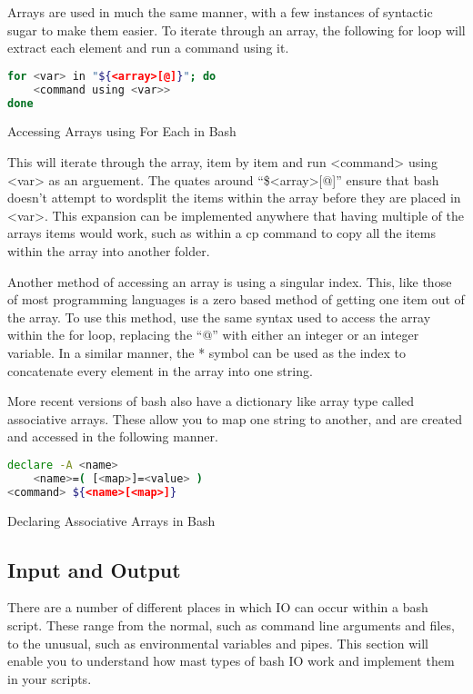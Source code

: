 			Arrays are used in much the same manner, with a few instances of syntactic sugar to make them easier.
			To iterate through an array, the following for loop will extract each element and run a command using it.
			\begin{code}
			\begin{lstlisting}[language=bash]
for <var> in "${<array>[@]}"; do
	<command using <var>>
done
			\end{lstlisting}
			\label{code:ForEachArrayAccess}
			\caption{Accessing Arrays using For Each in Bash}
			\end{code}
			This will iterate through the array, item by item and run <command> using <var> as an arguement.
			The quates around ``\$<array>[@]'' ensure that bash doesn't attempt to wordsplit the items within the array before they are placed in <var>.
			This expansion can be implemented anywhere that having multiple of the arrays items would work, such as within a cp command to copy all the items within the array into another folder.

			Another method of accessing an array is using a singular index.
			This, like those of most programming languages is a zero based method of getting one item out of the array.
			To use this method, use the same syntax used to access the array within the for loop, replacing the ``@'' with either an integer or an integer variable.
			In a similar manner, the \** symbol can be used as the index to concatenate every element in the array into one string.

			More recent versions of bash also have a dictionary like array type called associative arrays.
			These allow you to map one string to another, and are created and accessed in the following manner.
			\begin{code}
			\begin{lstlisting}[language=bash]
declare -A <name>
	<name>=( [<map>]=<value> )
<command> ${<name>[<map>]}
			\end{lstlisting}
			\label{code:DeclareAssociativeArrayBash}
			\caption{Declaring Associative Arrays in Bash}
			\end{code}

		\subsection{Input and Output}
			There are a number of different places in which IO can occur within a bash script.
			These range from the normal, such as command line arguments and files, to the unusual, such as environmental variables and pipes.
			This section will enable you to understand how mast types of bash IO work and implement them in your scripts.

